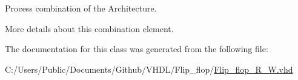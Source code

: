 Process combination of the Architecture. 

More details about this combination element. 

The documentation for this class was generated from the following file\+:\begin{DoxyCompactItemize}
\item 
C\+:/\+Users/\+Public/\+Documents/\+Github/\+V\+H\+D\+L/\+Flip\+\_\+flop/\hyperlink{_flip__flop___r___w_8vhd}{Flip\+\_\+flop\+\_\+\+R\+\_\+\+W.\+vhd}\end{DoxyCompactItemize}
